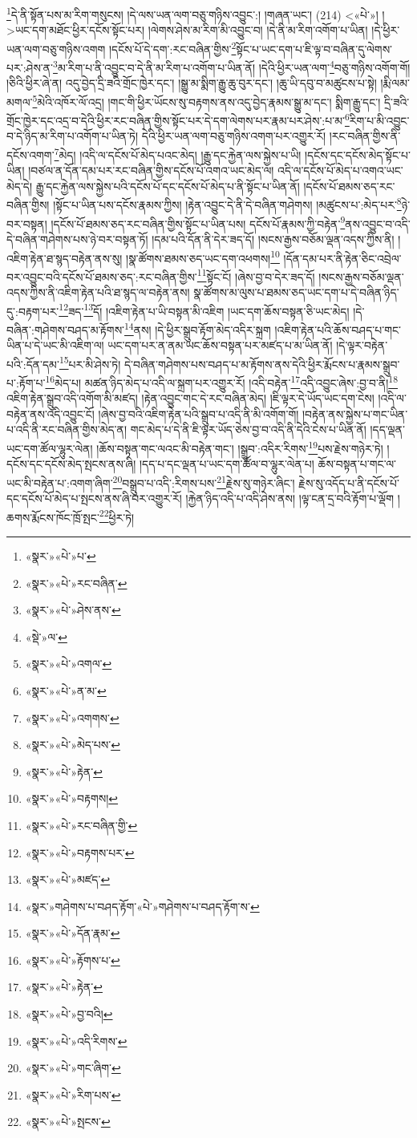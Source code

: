 \footnote{«སྣར་»«པེ་»པ་}དེ་ནི་སྟོན་པས་མ་རིག་གསུངས། །དེ་ལས་ཡན་ལག་བཅུ་གཉིས་འབྱུང་:། །གཞན་ཡང་། (214) <«པེ་»། །
 >ཡང་དག་མཐོང་ཕྱིར་དངོས་སྟོང་པར། །ལེགས་ཤེས་མ་རིག་མི་འབྱུང་བ། །དེ་ནི་མ་རིག་འགོག་པ་ཡིན། །དེ་ཕྱིར་ཡན་ལག་བཅུ་གཉིས་འགག །དངོས་པོ་དེ་དག་:རང་བཞིན་གྱིས་\footnote{«སྣར་»«པེ་»རང་བཞིན་}སྟོང་པ་ཡང་དག་པ་ཇི་ལྟ་བ་བཞིན་དུ་ལེགས་པར་:ཤེས་ན་\footnote{«སྣར་»«པེ་»ཤེས་ནས་}མ་རིག་པ་ནི་འབྱུང་བ་དེ་ནི་མ་རིག་པ་འགོག་པ་ཡིན་ནོ། །དེའི་ཕྱིར་ཡན་ལག་\footnote{«སྡེ་»ལ་}བཅུ་གཉིས་འགོག་གོ། །ཅིའི་ཕྱིར་ཞེ་ན། འདུ་བྱེད་དྲི་ཟའི་གྲོང་ཁྱེར་དང་། །སྒྱུ་མ་སྨིག་རྒྱུ་ཆུ་བུར་དང་། །ཆུ་ཡི་དབུ་བ་མཚུངས་པ་སྟེ། །རྨི་ལམ་མགལ་\footnote{«སྣར་»«པེ་»འགལ་}མེའི་འཁོར་ལོ་འདྲ། །གང་གི་ཕྱིར་ཡོངས་སུ་བརྟགས་ནས་འདུ་བྱེད་རྣམས་སྒྱུ་མ་དང་། སྨིག་རྒྱུ་དང་། དྲི་ཟའི་གྲོང་ཁྱེར་དང་འདྲ་བ་དེའི་ཕྱིར་རང་བཞིན་གྱིས་སྟོང་པར་དེ་དག་ལེགས་པར་རྣམ་པར་ཤེས་:པ་མ་\footnote{«སྣར་»«པེ་»ན་མ་}རིག་པ་མི་འབྱུང་བ་དེ་ཉིད་མ་རིག་པ་འགོག་པ་ཡིན་ཏེ། དེའི་ཕྱིར་ཡན་ལག་བཅུ་གཉིས་འགག་པར་འགྱུར་རོ། །རང་བཞིན་གྱིས་ནི་དངོས་འགག་\footnote{«སྣར་»«པེ་»འགགས་}མེད། །འདི་ལ་དངོས་པོ་མེད་པའང་མེད། །རྒྱུ་དང་རྐྱེན་ལས་སྐྱེས་པ་ཡི། །དངོས་དང་དངོས་མེད་སྟོང་པ་ཡིན། །བཙལ་ན་དོན་དམ་པར་རང་བཞིན་གྱིས་དངོས་པོ་འགའ་ཡང་མེད་ལ། འདི་ལ་དངོས་པོ་མེད་པ་འགའ་ཡང་མེད་དེ། རྒྱུ་དང་རྐྱེན་ལས་སྐྱེས་པའི་དངོས་པོ་དང་དངོས་པོ་མེད་པ་ནི་སྟོང་པ་ཡིན་ནོ། །དངོས་པོ་ཐམས་ཅད་རང་བཞིན་གྱིས། །སྟོང་པ་ཡིན་པས་དངོས་རྣམས་ཀྱིས། །རྟེན་འབྱུང་དེ་ནི་དེ་བཞིན་གཤེགས། །མཚུངས་པ་:མེད་པར་\footnote{«སྣར་»«པེ་»མེད་པས་}ཉེ་བར་བསྟན། །དངོས་པོ་ཐམས་ཅད་རང་བཞིན་གྱིས་སྟོང་པ་ཡིན་པས། དངོས་པོ་རྣམས་ཀྱི་བརྟེན་\footnote{«སྣར་»«པེ་»རྟེན་}ནས་འབྱུང་བ་འདི་དེ་བཞིན་གཤེགས་པས་ཉེ་བར་བསྟན་ཏོ། །དམ་པའི་དོན་ནི་དེར་ཟད་དོ། །སངས་རྒྱས་བཅོམ་ལྡན་འདས་ཀྱིས་ནི། །འཇིག་རྟེན་ཐ་སྙད་བརྟེན་ནས་སུ། །སྣ་ཚོགས་ཐམས་ཅད་ཡང་དག་འཕགས།\footnote{«སྣར་»«པེ་»བརྟགས།} །དོན་དམ་པར་ནི་རྟེན་ཅིང་འབྲེལ་བར་འབྱུང་བའི་དངོས་པོ་ཐམས་ཅད་:རང་བཞིན་གྱིས་\footnote{«སྣར་»«པེ་»རང་བཞིན་གྱི་}སྟོང་ངོ། །ཞེས་བྱ་བ་དེར་ཟད་དོ། །སངས་རྒྱས་བཅོམ་ལྡན་འདས་ཀྱིས་ནི་འཇིག་རྟེན་པའི་ཐ་སྙད་ལ་བརྟེན་ནས། སྣ་ཚོགས་མ་ལུས་པ་ཐམས་ཅད་ཡང་དག་པ་དེ་བཞིན་ཉིད་དུ་:བརྟག་པར་\footnote{«སྣར་»«པེ་»བརྟགས་པར་}ཟད་\footnote{«སྣར་»«པེ་»མཛད་}དོ། །འཇིག་རྟེན་པ་ཡི་བསྟན་མི་འཇིག །ཡང་དག་ཆོས་བསྟན་ཅི་ཡང་མེད། །དེ་བཞིན་:གཤེགས་བཤད་མ་རྟོགས་\footnote{«སྣར་»གཤེགས་པ་བཤད་རྟོག་«པེ་»གཤེགས་པ་བཤད་རྟོག་ས་}ནས། །དེ་ཕྱིར་སྒྲུབ་རྟོག་མེད་འདིར་སྐྲག །འཇིག་རྟེན་པའི་ཆོས་བཤད་པ་གང་ཡིན་པ་དེ་ཡང་མི་འཇིག་ལ། ཡང་དག་པར་ན་ནམ་ཡང་ཆོས་བསྟན་པར་མཛད་པ་མ་ཡིན་ནོ། །དེ་ལྟར་བརྟེན་པའི་:དོན་དམ་\footnote{«སྣར་»«པེ་»དོན་རྣམ་}པར་མི་ཤེས་ཏེ། དེ་བཞིན་གཤེགས་པས་བཤད་པ་མ་རྟོགས་ནས་དེའི་ཕྱིར་རྨོངས་པ་རྣམས་སྒྲུབ་པ་:རྟོག་པ་\footnote{«སྣར་»«པེ་»རྟོགས་པ་}མེད་པ། མཚན་ཉིད་མེད་པ་འདི་ལ་སྐྲག་པར་འགྱུར་རོ། །འདི་བརྟེན་\footnote{«སྣར་»«པེ་»རྟེན་}འདི་འབྱུང་ཞེས་:བྱ་བ་ནི།\footnote{«སྣར་»«པེ་»བྱ་བའི།} འཇིག་རྟེན་སྒྲུབ་འདི་འགོག་མི་མཛད། །རྟེན་འབྱུང་གང་དེ་རང་བཞིན་མེད། །ཇི་ལྟར་དེ་ཡོད་ཡང་དག་ངེས། །འདི་ལ་བརྟེན་ནས་འདི་འབྱུང་ངོ། །ཞེས་བྱ་བའི་འཇིག་རྟེན་པའི་སྒྲུབ་པ་འདི་ནི་མི་འགོག་གོ། །བརྟེན་ནས་སྐྱེས་པ་གང་ཡིན་པ་འདི་ནི་རང་བཞིན་གྱིས་མེད་ན། གང་མེད་པ་དེ་ནི་ཇི་ལྟར་ཡོད་ཅེས་བྱ་བ་འདི་ནི་དེའི་ངེས་པ་ཡིན་ནོ། །དད་ལྡན་ཡང་དག་ཚོལ་ལྷུར་ལེན། །ཆོས་བསྟན་གང་ལའང་མི་བརྟེན་གང་། །སྒྲུབ་:འདིར་རིགས་\footnote{«སྣར་»«པེ་»འདི་རིགས་}པས་རྗེས་གཉེར་ཏེ། །དངོས་དང་དངོས་མེད་སྤངས་ནས་ཞི། །དད་པ་དང་ལྡན་པ་ཡང་དག་ཚོལ་བ་ལྷུར་ལེན་པ། ཆོས་བསྟན་པ་གང་ལ་ཡང་མི་བརྟེན་པ་:འགག་ཞིག་\footnote{«སྣར་»«པེ་»གང་ཞིག་}བསྒྲུབ་པ་འདི་:རིགས་པས་\footnote{«སྣར་»«པེ་»རིག་པས་}རྗེས་སུ་གཉེར་ཞིང་། རྗེས་སུ་འདོད་པ་ནི་དངོས་པོ་དང་དངོས་པོ་མེད་པ་སྤངས་ནས་ཞི་བར་འགྱུར་རོ། །རྐྱེན་ཉིད་འདི་པ་འདི་ཤེས་ནས། །ལྟ་ངན་དྲ་བའི་རྟོག་པ་ལྡོག །ཆགས་རྨོངས་ཁོང་ཁྲོ་སྤང་\footnote{«སྣར་»«པེ་»སྤངས་}ཕྱིར་ཏེ། 